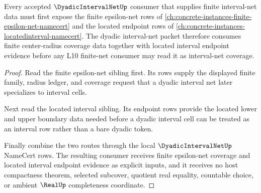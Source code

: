 \begin{theorem}\label{thm:dyadic-interval-net-sibling-anchor}
Every accepted $\DyadicIntervalNetUp$ consumer that supplies finite interval-net data must first expose the finite epsilon-net rows of \autoref{ch:concrete-instances-finite-epsilon-net-namecert} and the located endpoint rows of \autoref{ch:concrete-instances-locatedinterval-namecert}. The dyadic interval-net packet therefore consumes finite center-radius coverage data together with located interval endpoint evidence before any L10 finite-net consumer may read it as interval-net coverage.
\end{theorem}
\begin{proof}
Read the finite epsilon-net sibling first. Its rows supply the displayed finite family, radius ledger, and coverage request that a dyadic interval net later specializes to interval cells.

Next read the located interval sibling. Its endpoint rows provide the located lower and upper boundary data needed before a dyadic interval cell can be treated as an interval row rather than a bare dyadic token.

Finally combine the two routes through the local $\DyadicIntervalNetUp$ NameCert rows. The resulting consumer receives finite epsilon-net coverage and located interval endpoint evidence as explicit inputs, and it receives no host compactness theorem, selected subcover, quotient real equality, countable choice, or ambient $\RealUp$ completeness coordinate.
\end{proof}
